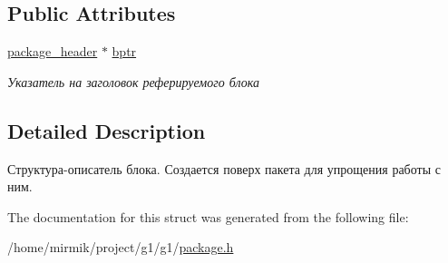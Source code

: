 \subsection*{Public Attributes}
\begin{DoxyCompactItemize}
\item 
\hyperlink{structg1_1_1package__header}{package\+\_\+header} $\ast$ \hyperlink{structg1_1_1package_a1e75b5ccd00f3b8bd3c7958bc6d957e9}{bptr}\hypertarget{structg1_1_1package_a1e75b5ccd00f3b8bd3c7958bc6d957e9}{}\label{structg1_1_1package_a1e75b5ccd00f3b8bd3c7958bc6d957e9}

\begin{DoxyCompactList}\small\item\em Указатель на заголовок реферируемого блока \end{DoxyCompactList}\end{DoxyCompactItemize}


\subsection{Detailed Description}
Структура-\/описатель блока. Создается поверх пакета для упрощения работы с ним. 

The documentation for this struct was generated from the following file\+:\begin{DoxyCompactItemize}
\item 
/home/mirmik/project/g1/g1/\hyperlink{package_8h}{package.\+h}\end{DoxyCompactItemize}
